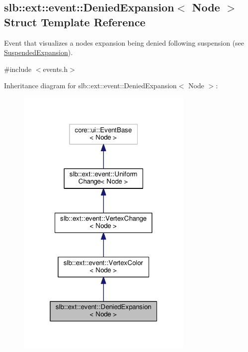 \hypertarget{structslb_1_1ext_1_1event_1_1DeniedExpansion}{}\subsection{slb\+:\+:ext\+:\+:event\+:\+:Denied\+Expansion$<$ Node $>$ Struct Template Reference}
\label{structslb_1_1ext_1_1event_1_1DeniedExpansion}


Event that visualizes a node\textquotesingle{}s expansion being denied following suspension (see \hyperlink{structslb_1_1ext_1_1event_1_1SuspendedExpansion}{Suspended\+Expansion}).  




{\ttfamily \#include $<$events.\+h$>$}



Inheritance diagram for slb\+:\+:ext\+:\+:event\+:\+:Denied\+Expansion$<$ Node $>$\+:\nopagebreak
\begin{figure}[H]
\begin{center}
\leavevmode
\includegraphics[width=241pt]{structslb_1_1ext_1_1event_1_1DeniedExpansion__inherit__graph}
\end{center}
\end{figure}


